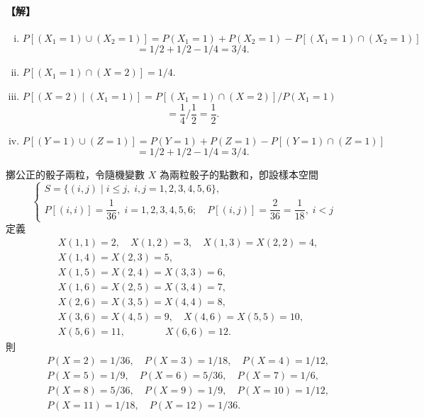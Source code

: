 \paragraph{【解】}
\begin{enumerate}[(i)]
  \item $P[(X_1 = 1) \cup (X_2 = 1)] = P(X_1 = 1) + P(X_2 = 1) - P[(X_1 = 1) \cap (X_2 = 1)]$
  \[
  = 1/2 + 1/2 - 1/4 = 3/4.
  \]
  \item $P[(X_1 = 1) \cap (X = 2)] = 1/4.$
  \item $P[(X = 2) \mid (X_1 = 1)] = P[(X_1 = 1) \cap (X = 2)] / P(X_1 = 1)$
  \[
  = \frac{1}{4} \Big/ \frac{1}{2} = \frac{1}{2}.
  \]
  \item $P[(Y = 1) \cup (Z = 1)] = P(Y = 1) + P(Z = 1) - P[(Y = 1) \cap (Z = 1)]$
  \[
  = 1/2 + 1/2 - 1/4 = 3/4. \tag*{\#}
  \]
\end{enumerate}

\medskip
\begin{example}\label{ex:b5s-5-3}
擲公正的骰子兩粒，令隨機變數 $X$ 為兩粒骰子的點數和，卽設樣本空間
\[
\begin{cases}
S = \{(i, j) \mid i \le j, \; i, j = 1, 2, 3, 4, 5, 6\}, \\
P[(i, i)] = \dfrac{1}{36}, \; i = 1, 2, 3, 4, 5, 6; \quad P[(i, j)] = \dfrac{2}{36} = \dfrac{1}{18}, \; i < j
\end{cases}
\]
定義
\begin{align*}
&X(1, 1) = 2, \quad X(1, 2) = 3, \quad X(1, 3) = X(2, 2) = 4, \\
&X(1, 4) = X(2, 3) = 5, \\
&X(1, 5) = X(2, 4) = X(3, 3) = 6, \\
&X(1, 6) = X(2, 5) = X(3, 4) = 7, \\
&X(2, 6) = X(3, 5) = X(4, 4) = 8, \\
&X(3, 6) = X(4, 5) = 9, \quad X(4, 6) = X(5, 5) = 10, \\
&X(5, 6) = 11, \qquad\qquad X(6, 6) = 12.
\end{align*}
則
\begin{align*}
&P(X = 2) = 1/36, \quad P(X = 3) = 1/18, \quad P(X = 4) = 1/12, \\
&P(X = 5) = 1/9, \quad P(X = 6) = 5/36, \quad P(X = 7) = 1/6, \\
&P(X = 8) = 5/36, \quad P(X = 9) = 1/9, \quad P(X = 10) = 1/12, \\
&P(X = 11) = 1/18, \quad P(X = 12) = 1/36. \tag*{\#}
\end{align*}
\end{example}

